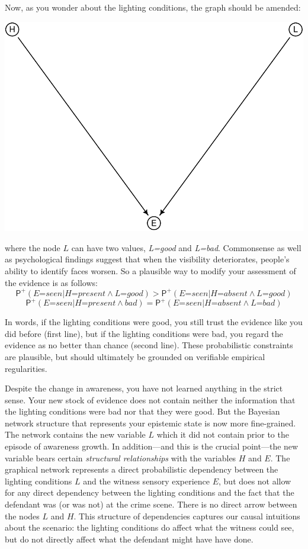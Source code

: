 \documentclass[
  11pt,
  dvipsnames,enabledeprecatedfontcommands]{scrartcl}
\newcommand{\ppr}[2]{\ensuremath{\mathsf{P}^{#1}(#2)}}
\begin{document}
Now, as you wonder about the lighting conditions, the graph should be
amended:

\begin{center}\includegraphics[width=0.5\linewidth,height=0.3\textheight]{ReplyToSteeleStefansson5_files/figure-latex/lighting2DAG-1} \end{center}

\noindent where the node \(L\) can have two values, \textit{L=good} and
\textit{L=bad}. Commonsense as well as psychological findings suggest
that when the visibility deteriorates, people's ability to identify
faces worsen. So a plausible way to modify your assessment of the
evidence is as follows:
\[\ppr{+}{\textit{E=seen} \vert \textit{H=present} \wedge \textit{L=good}} > \ppr{+}{\textit{E=seen} \vert \textit{H=absent} \wedge \textit{L=good}}\]
\[\ppr{+}{\textit{E=seen} \vert \textit{H=present} \wedge \textit{bad}} = \ppr{+}{\textit{E=seen} \vert \textit{H=absent} \wedge \textit{L=bad}}\]

\noindent In words, if the lighting conditions were good, you still
trust the evidence like you did before (first line), but if the lighting
conditions were bad, you regard the evidence as no better than chance
(second line). These probabilistic constraints are plausible, but should
ultimately be grounded on verifiable empirical regularities.

Despite the change in awareness, you have not learned anything in the
strict sense. Your new stock of evidence does not contain neither the
information that the lighting conditions were bad nor that they were
good. But the Bayesian network structure that represents your epistemic
state is now more fine-grained. The network contains the new variable
\(L\) which it did not contain prior to the episode of awareness growth.
In addition---and this is the crucial point---the new variable bears
certain \emph{structural relationships} with the variables \(H\) and
\(E\). The graphical network represents a direct probabilistic
dependency between the lighting conditions \(L\) and the witness sensory
experience \(E\), but does not allow for any direct dependency between
the lighting conditions and the fact that the defendant was (or was not)
at the crime scene. There is no direct arrow between the nodes \(L\) and
\(H\). This structure of dependencies captures our causal intuitions
about the scenario: the lighting conditions do affect what the witness
could see, but do not directly affect what the defendant might have have
done.
\end{document}
